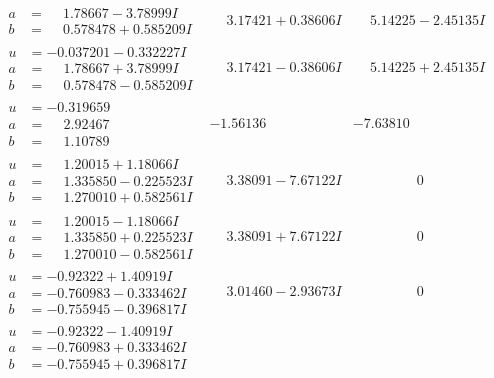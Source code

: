 \documentclass[1p]{elsarticle_modified}
\theoremstyle{definition}
\begin{document}
$$\begin{array}{c|c|c}
\begin{aligned}
a &= \phantom{-}1.78667 - 3.78999 I \\
b &= \phantom{-}0.578478 + 0.585209 I\end{aligned}
 & \phantom{-}3.17421 + 0.38606 I & \phantom{-}5.14225 - 2.45135 I \\ \hline\begin{aligned}
u &= -0.037201 - 0.332227 I \\
a &= \phantom{-}1.78667 + 3.78999 I \\
b &= \phantom{-}0.578478 - 0.585209 I\end{aligned}
 & \phantom{-}3.17421 - 0.38606 I & \phantom{-}5.14225 + 2.45135 I \\ \hline\begin{aligned}
u &= -0.319659\phantom{ +0.000000I} \\
a &= \phantom{-}2.92467\phantom{ +0.000000I} \\
b &= \phantom{-}1.10789\phantom{ +0.000000I}\end{aligned}
 & -1.56136\phantom{ +0.000000I} & -7.63810\phantom{ +0.000000I} \\ \hline\begin{aligned}
u &= \phantom{-}1.20015 + 1.18066 I \\
a &= \phantom{-}1.335850 - 0.225523 I \\
b &= \phantom{-}1.270010 + 0.582561 I\end{aligned}
 & \phantom{-}3.38091 - 7.67122 I & \phantom{-0.000000 } 0 \\ \hline\begin{aligned}
u &= \phantom{-}1.20015 - 1.18066 I \\
a &= \phantom{-}1.335850 + 0.225523 I \\
b &= \phantom{-}1.270010 - 0.582561 I\end{aligned}
 & \phantom{-}3.38091 + 7.67122 I & \phantom{-0.000000 } 0 \\ \hline\begin{aligned}
u &= -0.92322 + 1.40919 I \\
a &= -0.760983 - 0.333462 I \\
b &= -0.755945 - 0.396817 I\end{aligned}
 & \phantom{-}3.01460 - 2.93673 I & \phantom{-0.000000 } 0 \\ \hline\begin{aligned}
u &= -0.92322 - 1.40919 I \\
a &= -0.760983 + 0.333462 I \\
b &= -0.755945 + 0.396817 I\end{aligned}

\end{array}$$
\end{document}
